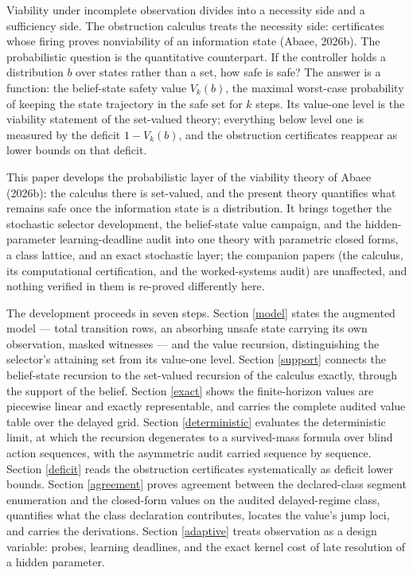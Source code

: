 \documentclass[10pt,twocolumn]{article}
\theoremstyle{plain}
\theoremstyle{definition}
\theoremstyle{remark}
\begin{document}
Viability under incomplete observation divides into a necessity side and a
sufficiency side. The obstruction calculus treats the necessity side:
certificates whose firing proves nonviability of an information state
(Abaee, 2026b). The probabilistic question is the quantitative counterpart.
If the controller holds a distribution \(b\) over states rather than a set,
how safe is safe? The answer is a function: the belief-state safety value
\(V_{k}(b)\), the maximal worst-case probability of keeping the state
trajectory in the safe set for \(k\) steps. Its value-one level is the
viability statement of the set-valued theory; everything below level one
is measured by the deficit \(1 - V_{k}(b)\), and the obstruction
certificates reappear as lower bounds on that deficit.

This paper develops the probabilistic layer of the viability theory of
Abaee (2026b): the calculus there is set-valued, and the present theory
quantifies what remains safe once the information state is a
distribution. It brings together the stochastic selector development, the
belief-state value campaign, and the hidden-parameter learning-deadline
audit into one theory with parametric closed forms, a class lattice, and
an exact stochastic layer; the companion papers (the calculus, its
computational certification, and the worked-systems audit) are unaffected,
and nothing verified in them is re-proved differently here.

The development proceeds in seven steps. Section \ref{model} states the
augmented model --- total transition rows, an absorbing unsafe state
carrying its own observation, masked witnesses --- and the value recursion,
distinguishing the selector's attaining set from its value-one level.
Section \ref{support} connects the belief-state recursion to the
set-valued recursion of the calculus exactly, through the support of the
belief. Section \ref{exact} shows the finite-horizon values are piecewise
linear and exactly representable, and carries the complete audited value
table over the delayed grid. Section \ref{deterministic} evaluates the
deterministic limit, at which the recursion degenerates to a
survived-mass formula over blind action sequences, with the asymmetric
audit carried sequence by sequence. Section \ref{deficit} reads the
obstruction certificates systematically as deficit lower bounds. Section \ref{agreement} proves agreement between the declared-class
segment enumeration and the closed-form values on the audited
delayed-regime class,
quantifies what the class declaration contributes, locates the value's
jump loci, and carries the derivations. Section \ref{adaptive} treats
observation as a design variable: probes, learning deadlines, and the
exact kernel cost of late resolution of a hidden parameter.
\end{document}
